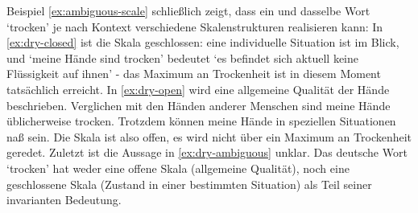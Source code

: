 Beispiel \ref{ex:ambiguous-scale} schließlich zeigt, dass ein und dasselbe Wort `trocken' je nach Kontext verschiedene Skalenstrukturen realisieren kann:
In \ref{ex:dry-closed} ist die Skala geschlossen: eine individuelle Situation ist im Blick, und `meine Hände sind trocken' bedeutet
`es befindet sich aktuell keine Flüssigkeit auf ihnen' - das Maximum an Trockenheit ist in diesem Moment tatsächlich erreicht.
In \ref{ex:dry-open} wird eine allgemeine Qualität der Hände beschrieben.
Verglichen mit den Händen anderer Menschen sind meine Hände üblicherweise trocken.
Trotzdem können meine Hände in speziellen Situationen naß sein. Die Skala ist also offen, es wird nicht über ein Maximum an Trockenheit geredet.
Zuletzt ist die Aussage in \ref{ex:dry-ambiguous} unklar. Das deutsche Wort `trocken' hat weder eine offene Skala (allgemeine Qualität), noch eine geschlossene Skala
(Zustand in einer bestimmten Situation) als Teil seiner invarianten Bedeutung.

